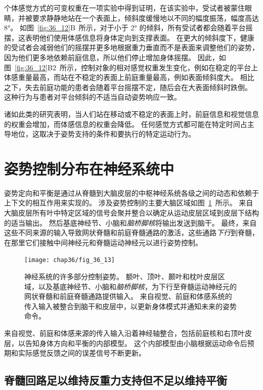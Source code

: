 个体感觉方式的可变权重在一项实验中得到证明，在该实验中，受试者被蒙住眼睛，并被要求静静地站在一个表面上，倾斜度缓慢地以不同的幅度振荡，幅度高达 8°。
如图~\ref{fig:36_12}B~所示，对于小于 2° 的倾斜，所有受试者都会随着平台摇摆，这表明他们使用体感信息将身体定向到支撑表面。
在更大的倾斜度下，健康的受试者会减弱他们的摇摆并更多地根据重力垂直而不是表面来调整他们的姿势，因为他们更多地依赖前庭信息，所以他们停止增加身体摇摆。
因此，如图~\ref{fig:36_12}B2~所示，控制对象的相对感觉权重发生变化，例如在稳定的平台上体感重量最高，而站在不稳定的表面上前庭重量最高，例如表面倾斜度大。
相比之下，失去前庭功能的患者会随着平台摇摆不定，随后会在大表面倾斜时跌倒。
这种行为与患者对平台倾斜的不适当自动姿势响应一致。


诸如此类的研究表明，当人们站在移动或不稳定的表面上时，前庭信息和视觉信息的权重会增加，而体感信息的权重会降低。
任何感觉方式都可能在特定时间占主导地位，这取决于姿势支持的条件和要执行的特定运动行为。



\section{姿势控制分布在神经系统中}

姿势定向和平衡是通过从脊髓到大脑皮层的中枢神经系统各级之间的动态和依赖于上下文的相互作用来实现的。
涉及姿势控制的主要大脑区域如图~\ref{fig:36_13}~所示。
来自大脑皮层所有叶中特定区域的信号会聚并整合以确定从运动皮层区域到皮层下结构的适当输出。
然后基底神经节、小脑和\textit{脑桥脚核}将输出发送到脑干。
最终，来自这些不同来源的输入导致网状脊髓和前庭脊髓通路的激活，这些通路\textit{下行}到脊髓，在那里它们接触中间神经元和脊髓运动神经元以进行姿势控制。


\begin{figure}[htbp]
	\centering
	\texttt{[image: chap36/fig\_36\_13]}
	\caption{神经系统的许多部分控制姿势。
		额叶、顶叶、颞叶和枕叶皮层区域，以及基底神经节、小脑和\textit{脑桥脚核}，为下行至脊髓运动神经元的网状脊髓和前庭脊髓通路提供输入。
		来自视觉、前庭和体感系统的传入输入被整合到脑干和皮层中，以更新身体模式并通知未来的姿势命令。}
	\label{fig:36_13}
\end{figure}


来自视觉、前庭和体感来源的传入输入沿着神经轴整合，包括前庭核和右顶叶皮层，以告知身体方向和平衡的内部模型。
这个内部模型由小脑根据运动命令后预期和实际感觉反馈之间的误差信号不断更新。



\subsection{脊髓回路足以维持反重力支持但不足以维持平衡}

